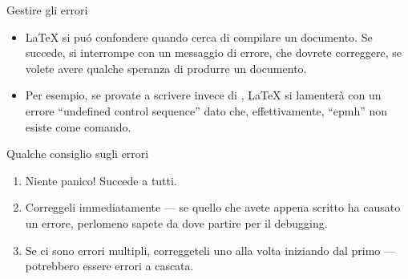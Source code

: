 \documentclass{beamer}
\begin{document}
\begin{frame}[fragile]{Gestire gli errori}
\begin{itemize}
\item \LaTeX{} si pu\'o confondere quando cerca di compilare un documento.
Se succede, si interrompe con un messaggio di errore, che dovrete correggere,
se volete avere qualche speranza di produrre un documento.
\item Per esempio, se provate a scrivere  invece di ,
\LaTeX{} si lamenter\`a con un errore ``undefined control sequence'' dato che, effettivamente, ``epmh'' non esiste come comando.
\end{itemize}
\begin{block}{Qualche consiglio sugli errori}
\begin{enumerate}
\item Niente panico! Succede a tutti.
\item Correggeli immediatamente --- se quello che avete appena scritto ha causato
un errore, perlomeno sapete da dove partire per il debugging.
\item Se ci sono errori multipli, correggeteli uno alla volta iniziando dal primo 
--- potrebbero essere errori a cascata.
\end{enumerate}
\end{block}
\end{frame}

\end{document}
